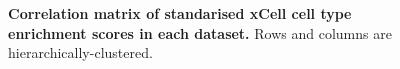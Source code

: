 \begin{figure}
\begin{subfigure}[b]{0.65\textwidth}
    \end{subfigure}
    \caption{
        \textbf{Correlation matrix of standarised xCell cell type enrichment scores in each dataset.}
        Rows and columns are hierarchically-clustered.
    }
    \label{fig:hird_xCell_correlationMatrix}
\end{figure}

%
%

